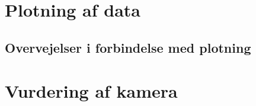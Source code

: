 \documentclass[working]{tuftebook}
\begin{document}
\section{Plotning af data}
\subsection{Overvejelser i forbindelse med plotning}
\section{Vurdering af kamera}
\end{document}
